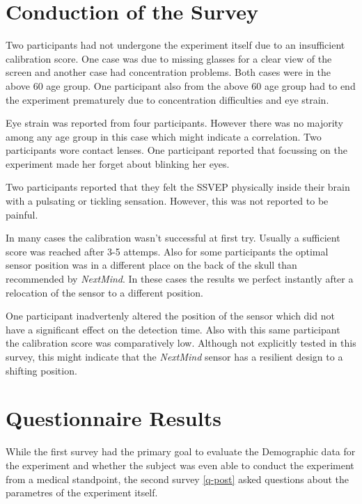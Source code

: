         \section{Conduction of the Survey}
            
            Two participants had not undergone the experiment itself due to an insufficient calibration score. One case was due to missing glasses for a clear view of the screen and another case had concentration problems. Both cases were in the above 60 age group.
            One participant also from the above 60 age group had to end the experiment prematurely due to concentration difficulties and eye strain.

            Eye strain was reported from four participants. However there was no majority among any age group in this case which might indicate a correlation. Two participants wore contact lenses. One participant reported that focussing on the experiment made her forget about blinking her eyes.

            Two participants reported that they felt the SSVEP physically inside their brain with a pulsating or tickling sensation. However, this was not reported to be painful.

            In many cases the calibration wasn't successful at first try. Usually a sufficient score was reached after 3-5 attemps. Also for some participants the optimal sensor position was in a different place on the back of the skull than recommended by \textit{NextMind}. In these cases the results we perfect instantly after a relocation of the sensor to a different position.

            One participant inadvertenly altered the position of the sensor which did not have a significant effect on the detection time. Also with this same participant the calibration score was comparatively low. Although not explicitly tested in this survey, this might indicate that the \textit{NextMind} sensor has a resilient design to a shifting position.
     
        \section{Questionnaire Results}

            While the first survey had the primary goal to evaluate the Demographic data for the experiment and whether the subject was even able to conduct the experiment from a medical standpoint, the second survey \ref*{q-post} asked questions about the parametres of the experiment itself.


